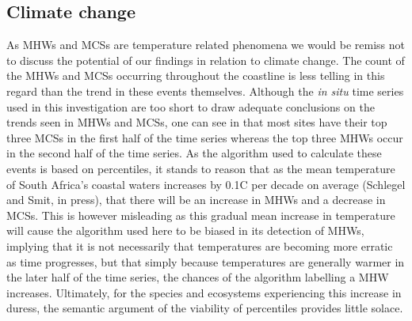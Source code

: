 \documentclass[a4paper,10pt,review]{elsarticle}
\begin{document}
\subsection{Climate change}
As MHWs and MCSs are temperature related phenomena we would be remiss not to discuss the potential of our findings in relation to climate change. The count of the MHWs and MCSs occurring throughout the coastline is less telling in this regard than the trend in these events themselves. Although the \emph{in situ} time series used in this investigation are too short to draw adequate conclusions on the trends seen in MHWs and MCSs,  one can see in  that most sites have their top three MCSs in the first half of the time series whereas the top three MHWs occur in the second half of the time series. As the algorithm used to calculate these events is based on percentiles, it stands to reason that as the mean temperature of South Africa's coastal waters increases by 0.1\degree C per decade on average (Schlegel and Smit, in press), that there will be an increase in MHWs and a decrease in MCSs. This is however misleading as this gradual mean increase in temperature will cause the algorithm used here to be biased in its detection of MHWs, implying that it is not necessarily that temperatures are becoming more erratic  as time progresses, but that simply because temperatures are generally warmer in the later half of the time series, the chances of the algorithm labelling a MHW increases.  Ultimately, for the species and ecosystems experiencing this increase in duress, the semantic argument of the viability of percentiles provides little solace. 
\end{document}
